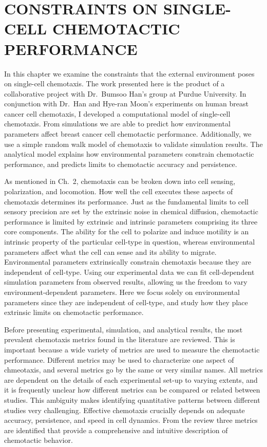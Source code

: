 
\chapter{CONSTRAINTS ON SINGLE-CELL CHEMOTACTIC PERFORMANCE}

\noindent
In this chapter we examine the constraints that the external environment poses on single-cell chemotaxis. The work presented here is the product of a collaborative project with Dr.\ Bumsoo Han's group at Purdue University. In conjunction with Dr.\ Han and Hye-ran Moon's experiments on human breast cancer cell chemotaxis, I developed a computational model of single-cell chemotaxis. From simulations we are able to predict how environmental parameters affect breast cancer cell chemotactic performance. Additionally, we use a simple random walk model of chemotaxis to validate simulation results. The analytical model explains how environmental parameters constrain chemotactic performance, and predicts limits to chemotactic accuracy and persistence.

As mentioned in Ch.\ 2, chemotaxis can be broken down into cell sensing, polarization, and locomotion. How well the cell executes these aspects of chemotaxis determines its performance. Just as the fundamental limits to cell sensory precision are set by the extrinsic noise in chemical diffusion, chemotactic performance is limited by extrinsic and intrinsic parameters comprising its three core components. The ability for the cell to polarize and induce motility is an intrinsic property of the particular cell-type in question, whereas environmental parameters affect what the cell can sense and its ability to migrate. Environmental parameters extrinsically constrain chemotaxis because they are independent of cell-type. Using our experimental data we can fit cell-dependent simulation parameters from observed results, allowing us the freedom to vary environment-dependent parameters. Here we focus solely on environmental parameters since they are independent of cell-type, and study how they place extrinsic limits on chemotactic performance.

Before presenting experimental, simulation, and analytical results, the most prevalent chemotaxis metrics found in the literature are reviewed. This is important because a wide variety of metrics are used to measure the chemotactic performance. Different metrics may be used to characterize one aspect of chmeotaxis, and several metrics go by the same or very similar names. All metrics are dependent on the details of each experimental set-up to varying extents, and it is frequently unclear how different metrics can be compared or related between studies. This ambiguity makes identifying quantitative patterns between different studies very challenging. Effective chemotaxis crucially depends on adequate accuracy, persistence, and speed in cell dynamics. From the review three metrics are identified that provide a comprehensive and intuitive description of chemotactic behavior.

